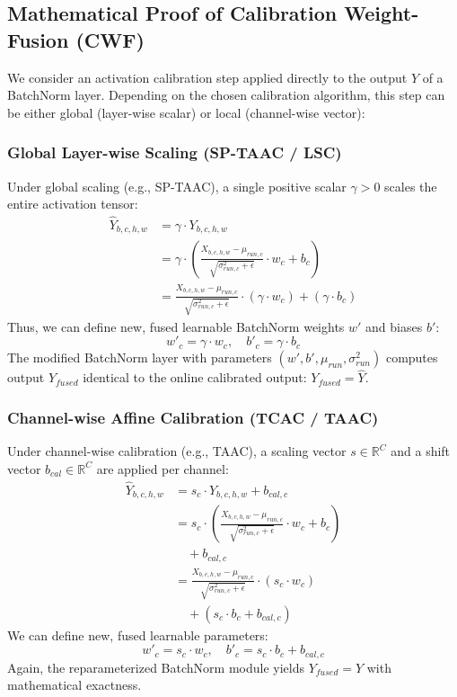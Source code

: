 \documentclass{article}
\begin{document}
\subsection{Mathematical Proof of Calibration Weight-Fusion (CWF)}
We consider an activation calibration step applied directly to the output $Y$ of a BatchNorm layer. Depending on the chosen calibration algorithm, this step can be either global (layer-wise scalar) or local (channel-wise vector):

\subsubsection{Global Layer-wise Scaling (SP-TAAC / LSC)}
Under global scaling (e.g., SP-TAAC), a single positive scalar $\gamma > 0$ scales the entire activation tensor:
\begin{align}
    \hat{Y}_{b, c, h, w} &= \gamma \cdot Y_{b, c, h, w} \nonumber \\
    &= \gamma \cdot \left( \frac{X_{b, c, h, w} - \mu_{run, c}}{\sqrt{\sigma_{run, c}^2 + \epsilon}} \cdot w_c + b_c \right) \nonumber \\
    &= \frac{X_{b, c, h, w} - \mu_{run, c}}{\sqrt{\sigma_{run, c}^2 + \epsilon}} \cdot (\gamma \cdot w_c) + (\gamma \cdot b_c)
\end{align}
Thus, we can define new, fused learnable BatchNorm weights $w'$ and biases $b'$:
\begin{equation}
    w'_c = \gamma \cdot w_c, \quad b'_c = \gamma \cdot b_c
\end{equation}
The modified BatchNorm layer with parameters $(w', b', \mu_{run}, \sigma_{run}^2)$ computes output $Y_{fused}$ identical to the online calibrated output: $Y_{fused} = \hat{Y}$.

\subsubsection{Channel-wise Affine Calibration (TCAC / TAAC)}
Under channel-wise calibration (e.g., TAAC), a scaling vector $s \in \mathbb{R}^C$ and a shift vector $b_{cal} \in \mathbb{R}^C$ are applied per channel:
\begin{align}
    \hat{Y}_{b, c, h, w} &= s_c \cdot Y_{b, c, h, w} + b_{cal, c} \nonumber \\
    &= s_c \cdot \left( \frac{X_{b, c, h, w} - \mu_{run, c}}{\sqrt{\sigma_{run, c}^2 + \epsilon}} \cdot w_c + b_c \right) \nonumber \\
    &\quad + b_{cal, c} \nonumber \\
    &= \frac{X_{b, c, h, w} - \mu_{run, c}}{\sqrt{\sigma_{run, c}^2 + \epsilon}} \cdot (s_c \cdot w_c) \nonumber \\
    &\quad + (s_c \cdot b_c + b_{cal, c})
\end{align}
We can define new, fused learnable parameters:
\begin{equation}
    w'_c = s_c \cdot w_c, \quad b'_c = s_c \cdot b_c + b_{cal, c}
    \label{eq:channel_fuse}
\end{equation}
Again, the reparameterized BatchNorm module yields $Y_{fused} = \hat{Y}$ with mathematical exactness.
\end{document}
